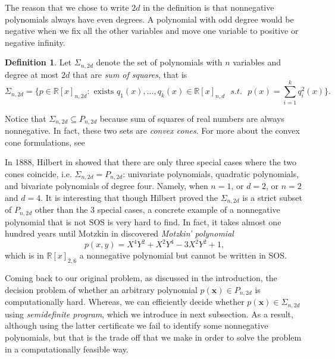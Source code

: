 \documentclass[12pt]{amsart}
\numberwithin{equation}{section}
\theoremstyle{definition}
\newtheorem{definition}[thm]{Definition}
\numberwithin{thm}{section}
\begin{document}
The reason that we chose to write $2d$ in the definition is that {nonnegative polynomials} always have even degrees.
A polynomial with odd degree would be negative when we fix all the other variables and move one variable to positive or negative infinity. 

\begin{definition}
     \label{def:SOS}
          Let $\Sigma_{n,2d}$ denote the set of polynomials with $n$ variables and degree at most
          $2d$ that are \emph{sum of squares}, that is
          \begin{equation*}
               \Sigma_{n, 2d} = \{ p \in \mathbb{R}[x]_{n, 2d}: \text{ exists } q_1(x), ..., q_k(x) \in \mathbb{R}[x]_{n,d} \text{ } s.t. \text{ }  p(x) = \sum_{i=1}^k q_i^2(x)\}.
          \end{equation*}     
\end{definition}

Notice that $\Sigma_{n,2d} \subseteq P_{n, 2d}$ because sum of squares of real numbers are always nonnegative. 
In fact, these two sets are \emph{convex cones}. 
For more about the convex cone formulations, see \cite[Chapter~3]{Blekherman:Parrilo:Thomas}

In 1888, Hilbert in \cite{hilbert_david_1888_1428214} showed that there are only three special cases where the two cones coincide, i.e. $\Sigma_{n,2d} = P_{n, 2d}$: 
univariate polynomials, quadratic polynomials, and bivariate polynomials of degree four. Namely, when $n = 1$, or $d = 2$, or $n = 2$ and $d = 4$.
It is interesting that though Hilbert proved the $\Sigma_{n,2d}$ is a strict subset of $P_{n, 2d}$ other than the 3 special cases, 
a concrete example of a nonnegative polynomial that is not SOS is very hard to find. 
In fact, it takes almost one hundred years until Motzkin in \cite{motzkin1967arithmetic} 
discovered \emph{Motzkin' polynomial} 
\begin{equation*}
     p(x, y) = X^4Y^2 + X^2Y^4 - 3 X^2Y^2 + 1,
\end{equation*}
which is in $\mathbb{R}[x]_{2, 6}$ a nonnegative polynomial but cannot be written in SOS.

Coming back to our original problem, as discussed in the introduction, the decision problem of whether an arbitrary polynomial $p(\mathbf{x}) \in P_{n, 2d}$ is computationally hard.
Whereas, we can efficiently decide whether $p(\mathbf{x}) \in \Sigma_{n, 2d}$ using \emph{semidefinite program}, which we introduce in next subsection. 
As a result, although using the latter certificate we fail to identify some nonnegative polynomials, but that is the trade off that we make in order to solve the problem in a computationally feasible way.
\end{document}
